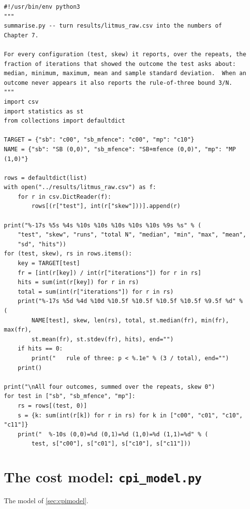 \begin{lstlisting}[style=vspython]
#!/usr/bin/env python3
"""
summarise.py -- turn results/litmus_raw.csv into the numbers of Chapter 7.

For every configuration (test, skew) it reports, over the repeats, the
fraction of iterations that showed the outcome the test asks about:
median, minimum, maximum, mean and sample standard deviation.  When an
outcome never appears it also reports the rule-of-three bound 3/N.
"""
import csv
import statistics as st
from collections import defaultdict

TARGET = {"sb": "c00", "sb_mfence": "c00", "mp": "c10"}
NAME = {"sb": "SB (0,0)", "sb_mfence": "SB+mfence (0,0)", "mp": "MP (1,0)"}

rows = defaultdict(list)
with open("../results/litmus_raw.csv") as f:
    for r in csv.DictReader(f):
        rows[(r["test"], int(r["skew"]))].append(r)

print("%-17s %5s %4s %10s %10s %10s %10s %10s %9s %s" % (
    "test", "skew", "runs", "total N", "median", "min", "max", "mean",
    "sd", "hits"))
for (test, skew), rs in rows.items():
    key = TARGET[test]
    fr = [int(r[key]) / int(r["iterations"]) for r in rs]
    hits = sum(int(r[key]) for r in rs)
    total = sum(int(r["iterations"]) for r in rs)
    print("%-17s %5d %4d %10d %10.5f %10.5f %10.5f %10.5f %9.5f %d" % (
        NAME[test], skew, len(rs), total, st.median(fr), min(fr), max(fr),
        st.mean(fr), st.stdev(fr), hits), end="")
    if hits == 0:
        print("   rule of three: p < %.1e" % (3 / total), end="")
    print()

print("\nAll four outcomes, summed over the repeats, skew 0")
for test in ["sb", "sb_mfence", "mp"]:
    rs = rows[(test, 0)]
    s = {k: sum(int(r[k]) for r in rs) for k in ["c00", "c01", "c10", "c11"]}
    print("  %-10s (0,0)=%d (0,1)=%d (1,0)=%d (1,1)=%d" % (
        test, s["c00"], s["c01"], s["c10"], s["c11"]))
\end{lstlisting}

\section{The cost model: \texttt{cpi\_model.py}}
The model of \cref{sec:cpimodel}.


